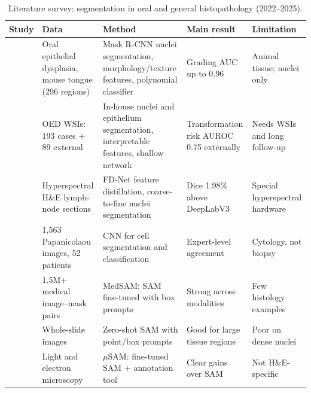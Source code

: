 \documentclass[10pt,twocolumn]{article}
\begin{document}
\begin{table}[t]
\centering
\caption{Literature survey: segmentation in oral and general histopathology (2022--2025).}
\label{tab:litseg}
\footnotesize
\begin{tabularx}{\textwidth}{@{}p{2.6cm}p{3.1cm}YYp{3.0cm}@{}}
\toprule
Study & Data & Method & Main result & Limitation \\
\midrule
\citet{silva2022} & Oral epithelial dysplasia, mouse tongue (296 regions) & Mask R-CNN nuclei segmentation, morphology/texture features, polynomial classifier & Grading AUC up to 0.96 & Animal tissue; nuclei only \\
\citet{shephard2024} & OED WSIs: 193 cases + 89 external & In-house nuclei and epithelium segmentation, interpretable features, shallow network & Transformation risk AUROC 0.75 externally & Needs WSIs and long follow-up \\
\citet{zhang2024} & Hyperspectral H\&E lymph-node sections & FD-Net feature distillation, coarse-to-fine nuclei segmentation & Dice 1.98\% above DeepLabV3 & Special hyperspectral hardware \\
\citet{ronnau2024} & 1,563 Papanicolaou images, 52 patients & CNN for cell segmentation and classification & Expert-level agreement & Cytology, not biopsy \\
\citet{ma2024} & 1.5M+ medical image--mask pairs & MedSAM: SAM fine-tuned with box prompts & Strong across modalities & Few histology examples \\
\citet{deng2025} & Whole-slide images & Zero-shot SAM with point/box prompts & Good for large tissue regions & Poor on dense nuclei \\
\citet{archit2025} & Light and electron microscopy & $\mu$SAM: fine-tuned SAM + annotation tool & Clear gains over SAM & Not H\&E-specific \\
\bottomrule
\end{tabularx}
\end{table}
\end{document}
